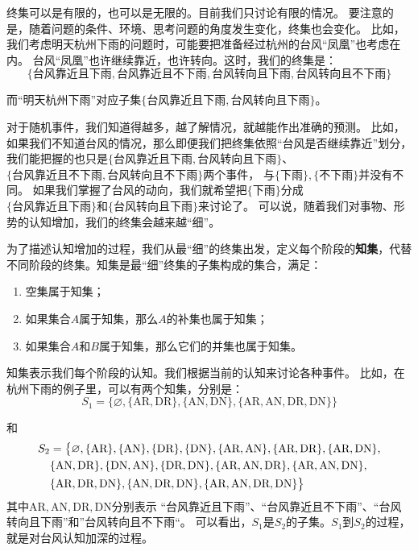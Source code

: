 \documentclass[12pt,UTF8]{ctexbook}
\begin{document}
终集可以是有限的，也可以是无限的。目前我们只讨论有限的情况。
要注意的是，随着问题的条件、环境、思考问题的角度发生变化，终集也会变化。
比如，我们考虑明天杭州下雨的问题时，可能要把准备经过杭州的台风“凤凰”也考虑在内。
台风“凤凰”也许继续靠近，也许转向。这时，我们的终集是：
$$\{\mbox{台风靠近且下雨}, \mbox{台风靠近且不下雨}, \mbox{台风转向且下雨}, \mbox{台风转向且不下雨}\}$$

而“明天杭州下雨”对应子集$\{\mbox{台风靠近且下雨}, \mbox{台风转向且下雨}\}$。

对于随机事件，我们知道得越多，越了解情况，就越能作出准确的预测。
比如，如果我们不知道台风的情况，那么即便我们把终集依照“台风是否继续靠近”划分，
我们能把握的也只是$\{\mbox{台风靠近且下雨}, \mbox{台风转向且下雨}\}$、
$\{\mbox{台风靠近且不下雨}, \mbox{台风转向且不下雨}\}$两个事件，
与$\{\mbox{下雨}\}, \{\mbox{不下雨}\}$并没有不同。
如果我们掌握了台风的动向，我们就希望把$\{\mbox{下雨}\}$分成\\   
$\{\mbox{台风靠近且下雨}\}$和$\{\mbox{台风转向且下雨}\}$来讨论了。
可以说，随着我们对事物、形势的认知增加，我们的终集会越来越“细”。

为了描述认知增加的过程，我们从最“细”的终集出发，定义每个阶段的\textbf{知集}，代替不同阶段的终集。知集是最“细”终集的子集构成的集合，满足：

\begin{enumerate}
    \item 空集属于知集；
    \item 如果集合$A$属于知集，那么$A$的补集也属于知集；
    \item 如果集合$A$和$B$属于知集，那么它们的并集也属于知集。
\end{enumerate}

知集表示我们每个阶段的认知。我们根据当前的认知来讨论各种事件。
比如，在杭州下雨的例子里，可以有两个知集，分别是：
$$ S_1 = \big\{\varnothing, \{\mbox{AR}, \mbox{DR}\},\{\mbox{AN}, \mbox{DN}\}, \{\mbox{AR}, \mbox{AN}, \mbox{DR}, \mbox{DN}\} \big\}$$

和
\begin{align}
    S_2 &= \big\{ \varnothing, \{\mbox{AR}\}, \{\mbox{AN}\}, \{\mbox{DR}\}, \{\mbox{DN}\}, \{\mbox{AR}, \mbox{AN}\}, \{\mbox{AR}, \mbox{DR}\}, \{\mbox{AR}, \mbox{DN}\}, \notag \\
    & \{\mbox{AN}, \mbox{DR}\}, \{\mbox{DN}, \mbox{AN}\}, \{\mbox{DR}, \mbox{DN}\},  \{\mbox{AR}, \mbox{AN}, \mbox{DR}\}, \{\mbox{AR}, \mbox{AN}, \mbox{DN}\}, \notag \\
    &  \{\mbox{AR}, \mbox{DR}, \mbox{DN}\},  \{\mbox{AN}, \mbox{DR}, \mbox{DN}\}, \{\mbox{AR}, \mbox{AN}, \mbox{DR}, \mbox{DN}\} \big\} \notag 
\end{align}
其中$\mbox{AR}, \mbox{AN}, \mbox{DR}, \mbox{DN}$分别表示
“台风靠近且下雨”、“台风靠近且不下雨”、“台风转向且下雨”和”台风转向且不下雨“。
可以看出，$S_1$是$S_2$的子集。$S_1$到$S_2$的过程，就是对台风认知加深的过程。
\end{document}
